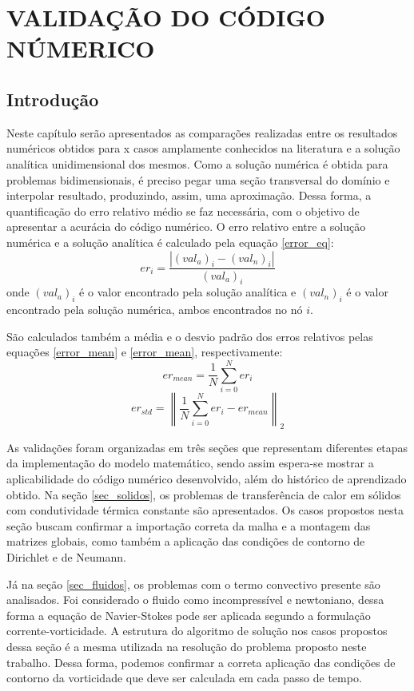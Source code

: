 \chapter{VALIDAÇÃO DO CÓDIGO NÚMERICO}
\label{validacao}
\section{\textbf{Introdução}}
Neste capítulo serão apresentados as comparações realizadas entre os resultados numéricos obtidos para x casos amplamente conhecidos na literatura e a solução analítica unidimensional dos mesmos.
Como a solução numérica é obtida para problemas bidimensionais, é preciso pegar uma seção transversal do domínio e interpolar  resultado, produzindo, assim, uma aproximação.
Dessa forma, a quantificação do erro relativo médio se faz necessária, com o objetivo de apresentar a acurácia do código numérico. O erro relativo entre a solução numérica e a solução analítica é calculado pela equação \eqref{error_eq}:
\begin{equation}
    er_i = \frac{|(val_a)_i - (val_n)_i|}{(val_a)_i}
    \label{error_eq} 
\end{equation}
onde $(val_a)_i$ é o valor encontrado pela solução analítica e $(val_n)_i$ é o valor encontrado pela solução numérica, ambos encontrados no nó $i$.

São calculados também a média e o desvio padrão dos erros relativos pelas equações \eqref{error_mean} e \eqref{error_mean}, respectivamente:
\begin{equation}
    er_{mean} = \frac{1}{N}\sum_{i=0}^{N} er_i
    \label{error_mean}
\end{equation}
\begin{equation}
    er_{std} = \left\| \frac{1}{N}\sum_{i=0}^{N} er_i-er_{mean} \right\|_2
    \label{error_std} 
\end{equation}

As validações foram organizadas em três seções que representam diferentes etapas da implementação do modelo matemático, sendo assim espera-se mostrar a aplicabilidade do código numérico desenvolvido, além do histórico de aprendizado obtido.
Na seção \ref{sec_solidos}, os problemas de transferência de calor em sólidos com condutividade térmica constante são apresentados.
Os casos propostos nesta seção buscam confirmar a importação correta da malha e a montagem das matrizes globais, como também a aplicação das condições de contorno de Dirichlet e de Neumann.

Já na seção \ref{sec_fluidos}, os problemas com o termo convectivo presente são analisados.
Foi considerado o fluido como incompressível e newtoniano, dessa forma a equação de Navier-Stokes pode ser aplicada segundo a formulação corrente-vorticidade.
A estrutura do algoritmo de solução nos casos propostos dessa seção é a mesma utilizada na resolução do problema proposto neste trabalho.
Dessa forma, podemos confirmar a correta aplicação das condições de contorno da vorticidade que deve ser calculada em cada passo de tempo.

